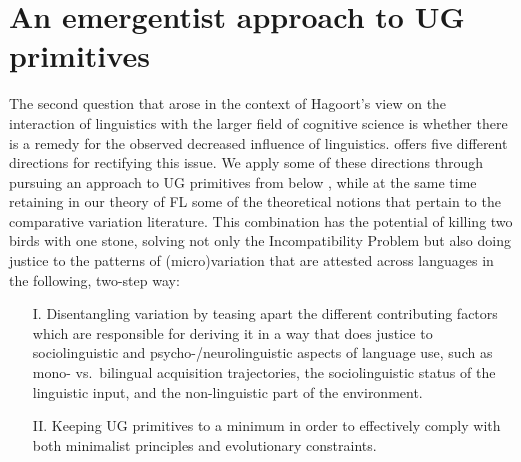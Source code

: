 \documentclass[output=paper]{langsci/langscibook}
\begin{document}
\section{An emergentist approach to UG primitives}\label{sec:ref:2}

The second question that arose in the context of Hagoort’s view on the
interaction of linguistics with the larger field of cognitive science is
whether there is a remedy for the observed decreased influence of linguistics.
\citet{Hagoort2014} offers five different directions for rectifying this issue.
We apply some of these directions through pursuing an approach to \gls{UG}
primitives from below \citep{Chomsky2007}, while at the same time retaining in
our theory of \gls{FL} some of the theoretical notions that pertain to the
comparative variation literature. This combination has the potential of killing
two birds with one stone, solving not only the Incompatibility Problem but also
doing justice to the patterns of (micro)variation that are attested across
languages in the following, two-step way:\largerpage

\begin{itemize}

    \item[I.] Disentangling variation by teasing apart the different
        contributing factors which are responsible for deriving it in a way
        that does justice to sociolinguistic and psycho-/neurolinguistic
        aspects of language use, such as mono- vs.\ bilingual acquisition
        trajectories, the sociolinguistic status of the linguistic input, and
        the non-linguistic part of the environment.

    \item[II.] Keeping \gls{UG} primitives to a minimum in order to effectively
        comply with both minimalist principles and evolutionary constraints.

\end{itemize}
\end{document}
